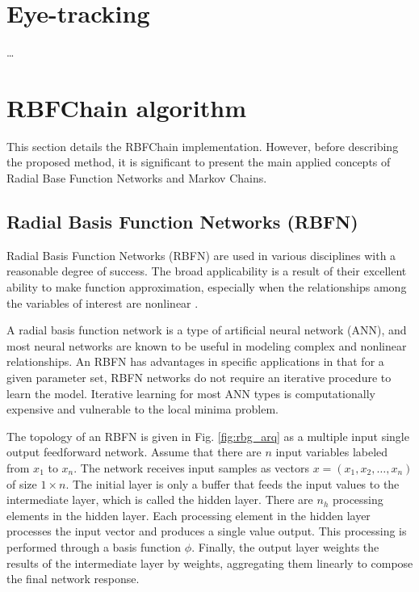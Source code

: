 \documentclass[preprint,12pt]{elsarticle}
\begin{document}
\section{Eye-tracking}
\label{sec:eye_tracking}

\ldots

\section{RBFChain algorithm}
\label{sec:rbfchain_algorithm}

This section details the RBFChain implementation. However, before describing the proposed method, it is significant to present the main applied concepts of Radial Base Function Networks and Markov Chains.

\subsection{Radial Basis Function Networks (RBFN)}

Radial Basis Function Networks (RBFN) are used in various disciplines with a reasonable degree of success. The broad applicability is a result of their excellent ability to make function approximation, especially when the relationships among the variables of interest are nonlinear \cite{Bishop:2006:PRM:1162264}.

A radial basis function network is a type of artificial neural network (ANN), and most neural networks are known to be useful in modeling complex and nonlinear relationships. An RBFN has advantages in specific applications in that for a given parameter set, RBFN networks do not require an iterative procedure to learn the model. Iterative learning for most ANN types is computationally expensive and vulnerable to the local minima problem.

The topology of an RBFN is given in Fig. \ref{fig:rbg_arq} as a multiple input single output feedforward network.
Assume that there are $n$ input variables labeled from $x_1$ to $x_n$.
The network receives input samples as vectors $x=(x_1, x_2, \ldots, x_n)$ of size $1 \times n$.
The initial layer is only a buffer that feeds the input values to the intermediate layer, which is called the hidden layer.
There are $n_h$ processing elements in the hidden layer.
Each processing element in the hidden layer processes the input vector and produces a single value output. This processing is performed through a basis function $\phi$.
Finally, the output layer weights the results of the intermediate layer by weights, aggregating them linearly to compose the final network response.
\end{document}
